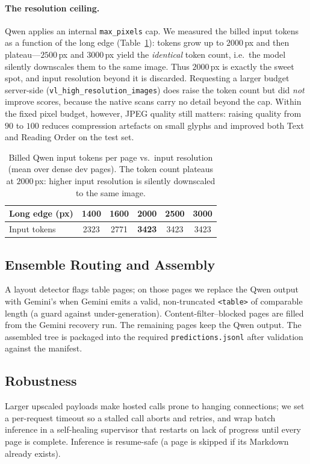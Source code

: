 \documentclass[11pt]{article}
\newcommand{\best}[1]{\textbf{#1}}
\begin{document}
\paragraph{The resolution ceiling.} Qwen applies an internal \texttt{max\_pixels}
cap. We measured the billed input tokens as a function of the long edge
(Table~\ref{tab:tokens}): tokens grow up to $2000$\,px and then plateau---$2500$\,px
and $3000$\,px yield the \emph{identical} token count, i.e.\ the model silently
downscales them to the same image. Thus $2000$\,px is exactly the sweet spot, and
input resolution beyond it is discarded. Requesting a larger budget server-side
(\texttt{vl\_high\_resolution\_images}) does raise the token count but did
\emph{not} improve scores, because the native scans carry no detail beyond the cap.
Within the fixed pixel budget, however, JPEG quality still matters: raising quality
from $90$ to $100$ reduces compression artefacts on small glyphs and improved both
Text and Reading Order on the test set.

\begin{table}[t]
\centering
\small
\begin{tabular}{lccccc}
\toprule
Long edge (px) & 1400 & 1600 & 2000 & 2500 & 3000 \\
\midrule
Input tokens & 2323 & 2771 & \best{3423} & 3423 & 3423 \\
\bottomrule
\end{tabular}
\caption{Billed Qwen input tokens per page vs.\ input resolution (mean over dense
dev pages). The token count plateaus at $2000$\,px: higher input resolution is
silently downscaled to the same image.}
\label{tab:tokens}
\end{table}

\subsection{Ensemble Routing and Assembly}
A layout detector \citep[DocLayout-YOLO;][]{zhao2024doclayout} flags table pages; on those pages we replace the
Qwen output with Gemini's when Gemini emits a valid, non-truncated \texttt{<table>}
of comparable length (a guard against under-generation). Content-filter--blocked
pages are filled from the Gemini recovery run. The remaining pages keep the Qwen
output. The assembled tree is packaged into the required \texttt{predictions.jsonl}
after validation against the manifest.

\subsection{Robustness}
Larger upscaled payloads make hosted calls prone to hanging connections; we set a
per-request timeout so a stalled call aborts and retries, and wrap batch inference in
a self-healing supervisor that restarts on lack of progress until every page is
complete. Inference is resume-safe (a page is skipped if its Markdown already
exists).
\end{document}
